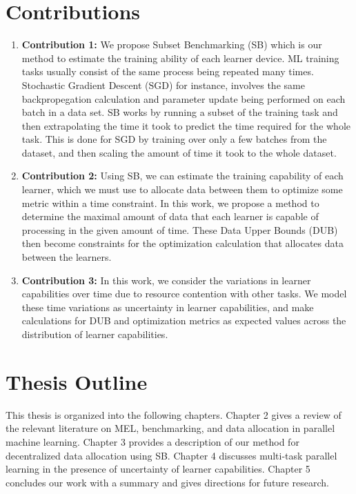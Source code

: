 \documentclass{article}
\begin{document}
\section{Contributions}

\begin{enumerate}
  \item \textbf{Contribution 1:} We propose Subset Benchmarking (SB) which is our method to estimate the training ability of each learner device. ML training tasks usually consist of the same process being repeated many times. Stochastic Gradient Descent (SGD) for instance, involves the same backpropegation calculation and parameter update being performed on each batch in a data set. SB works by running a subset of the training task and then extrapolating the time it took to predict the time required for the whole task. This is done for SGD by training over only a few batches from the dataset, and then scaling the amount of time it took to the whole dataset.
      
  \item \textbf{Contribution 2:} Using SB, we can estimate the training capability of each learner, which we must use to allocate data between them to optimize some metric within a time constraint. In this work, we propose a method to determine the maximal amount of data that each learner is capable of processing in the given amount of time. These Data Upper Bounds (DUB) then become constraints for the optimization calculation that allocates data between the learners.
  
  \item \textbf{Contribution 3:} In this work, we consider the variations in learner capabilities over time due to resource contention with other tasks. We model these time variations as uncertainty in learner capabilities, and make calculations for DUB and optimization metrics as expected values across the distribution of learner capabilities.
  
\end{enumerate}

\section{Thesis Outline}

This thesis is organized into the following chapters. Chapter 2 gives a review of the relevant literature on MEL, benchmarking, and data allocation in parallel machine learning. Chapter 3 provides a description of our method for decentralized data allocation using SB. Chapter 4 discusses multi-task parallel learning in the presence of uncertainty of learner capabilities. Chapter 5 concludes our work with a summary and gives directions for future research.
\end{document}
